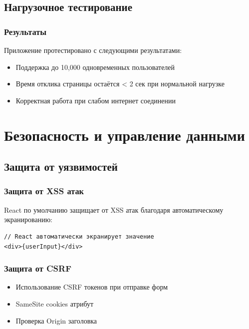 \documentclass[12pt,a4paper]{report}
\begin{document}
\section{Нагрузочное тестирование}

\subsection{Результаты}
Приложение протестировано с следующими результатами:
\begin{itemize}
    \item Поддержка до 10,000 одновременных пользователей
    \item Время отклика страницы остаётся < 2 сек при нормальной нагрузке
    \item Корректная работа при слабом интернет соединении
\end{itemize}

\newpage

\chapter{Безопасность и управление данными}

\section{Защита от уязвимостей}

\subsection{Защита от XSS атак}
React по умолчанию защищает от XSS атак благодаря автоматическому экранированию:
\begin{lstlisting}
// React автоматически экранирует значение
<div>{userInput}</div>
\end{lstlisting}

\subsection{Защита от CSRF}
\begin{itemize}
    \item Использование CSRF токенов при отправке форм
    \item SameSite cookies атрибут
    \item Проверка Origin заголовка
\end{itemize}
\end{document}
